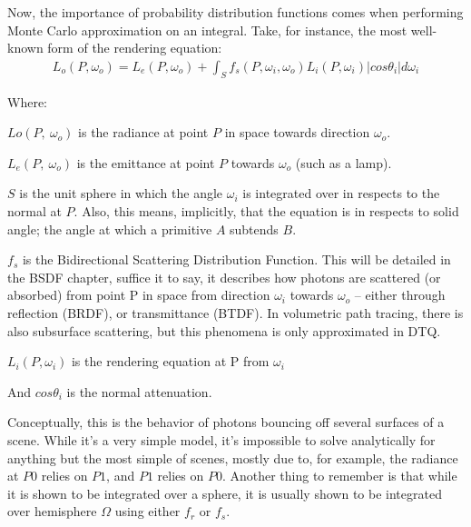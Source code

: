 \message{ !name(test.tex)}\documentclass{article}
\begin{document}
    
  
  Now, the importance of probability distribution functions comes when
performing Monte Carlo approximation on an integral. Take, for instance, the
most well-known form of the rendering equation:
  \begin{align}
    L_o(P, \omega_o) = L_e(P, \omega_o) + \int_{S}f_s(P, \omega_i,
    \omega_o) L_i(P, \omega_i) \vert cos\theta_i\vert d\omega_i
  \end{align}
  
  Where:
  \begin{list}{}{}
  	 \item $Lo(P,\:\omega_o)$ is the radiance at point $P$ in space towards direction $\omega_o$. 
  	 
  	 \item $L_e(P,\:\omega_o)$ is the emittance at point $P$ towards $\omega_o$
      (such as a lamp).
  	 
  	 
  	 \item $S$ is the unit sphere in which the angle $\omega_i$ is integrated
        over in respects to the normal at $P$. Also, this means, implicitly,
        that the equation is in respects to solid angle; the angle at which a
        primitive $A$ subtends $B$.
  	 
  	 \item $f_s$ is the Bidirectional Scattering Distribution Function. This
        will be detailed in the BSDF chapter, suffice it to say, it describes
        how photons are scattered (or absorbed) from point P in space from
        direction $\omega_i$ towards $\omega_o$ -- either through reflection
        (BRDF), or transmittance (BTDF). In volumetric path tracing, there is
        also subsurface scattering, but this phenomena is only approximated in
        DTQ.
  	 
  	 \item $L_i(P, \omega_i)$ is the rendering equation at P from $\omega_i$
  	 
  	 \item And $cos\theta_i$ is the normal attenuation.
  \end{list}
  Conceptually, this is the behavior of photons bouncing off several surfaces of
a scene. While it's a very simple model, it's impossible to solve analytically
for anything but the most simple of scenes, mostly due to, for example, the
radiance at $P0$ relies on $P1$, and $P1$ relies on $P0$. Another thing to
remember is that while it is shown to be integrated over a sphere, it is usually
shown to be integrated over hemisphere $\Omega$ using either $f_r$ or $f_s$.
  
\end{document}
